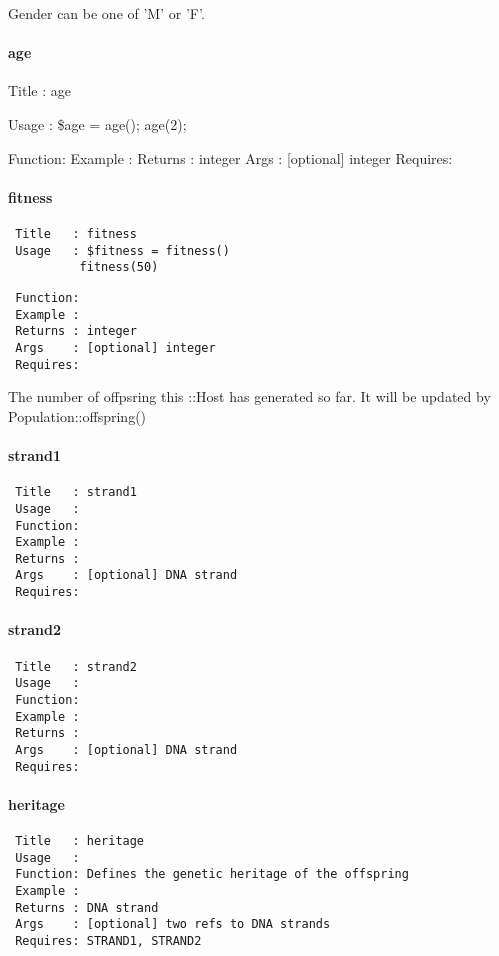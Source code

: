 Gender can be one of 'M' or 'F'.

\paragraph*{age\label{age}}


Title   : age



Usage   : \$age = age();
          age(2);



Function: 
Example :
Returns : integer
Args    : [optional] integer
 Requires:

\paragraph*{fitness\label{fitness}}
\begin{verbatim}
 Title   : fitness
 Usage   : $fitness = fitness()
          fitness(50)
\end{verbatim}
\begin{verbatim}
 Function: 
 Example :
 Returns : integer
 Args    : [optional] integer
 Requires:
\end{verbatim}


The number of offpsring this ::Host has generated so far. It will be
updated by Population::offspring()

\paragraph*{strand1\label{strand1}}
\begin{verbatim}
 Title   : strand1
 Usage   :
 Function: 
 Example :
 Returns : 
 Args    : [optional] DNA strand
 Requires:
\end{verbatim}
\paragraph*{strand2\label{strand2}}
\begin{verbatim}
 Title   : strand2
 Usage   : 
 Function: 
 Example : 
 Returns : 
 Args    : [optional] DNA strand
 Requires:
\end{verbatim}
\paragraph*{heritage\label{heritage}}
\begin{verbatim}
 Title   : heritage
 Usage   :
 Function: Defines the genetic heritage of the offspring
 Example :
 Returns : DNA strand
 Args    : [optional] two refs to DNA strands
 Requires: STRAND1, STRAND2
\end{verbatim}


